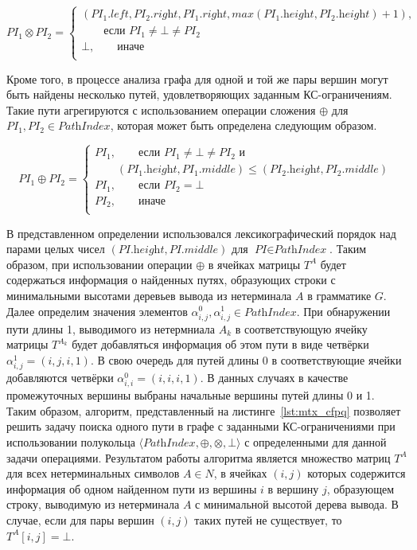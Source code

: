 $$\textit{PI}_1 \otimes \textit{PI}_2 = \begin{cases}
      (\textit{PI}_1.\textit{left}, \textit{PI}_2.\textit{right}, \textit{PI}_1.\textit{right}, max(\textit{PI}_1.\textit{height}, \textit{PI}_2.\textit{height}) + 1),\\
                     \qquad \text{если $\textit{PI}_1\neq \bot \neq \textit{PI}_2$} \\
      \bot, \qquad \text{иначе} \\
    \end{cases}\
$$

Кроме того, в процессе анализа графа для одной и той же пары вершин могут быть найдены несколько путей, удовлетворяющих заданным КС-ограничениям. Такие пути агрегируются с использованием операции сложения $\oplus$ для \mbox{$\textit{PI}_1, \textit{PI}_2 \in \textit{PathIndex}$}, которая может быть определена следующим образом.

$$\textit{PI}_1 \oplus \textit{PI}_2 = \begin{cases}
      \textit{PI}_1, \qquad \text{если $\textit{PI}_1\neq \bot \neq \textit{PI}_2$ и} \\ \qquad (\textit{PI}_1.\textit{height}, \textit{PI}_1.\textit{middle}) \leq (\textit{PI}_2.\textit{height}, \textit{PI}_2.\textit{middle}) \\
      \textit{PI}_1, \qquad \text{если $\textit{PI}_2 = \bot$} \\
      \textit{PI}_2, \qquad \text{иначе} \\
    \end{cases}\
$$

В представленном определении использовался лексикографический порядок над парами целых чисел $(\textit{PI}.\textit{height}, \textit{PI}.\textit{middle})$ для $\textit{PI} \in \textit{PathIndex}$. Таким образом, при использовании операции $\oplus$ в ячейках матрицы $T^A$ будет содержаться информация о найденных путях, образующих строки с минимальными высотами деревьев вывода из нетерминала $A$ в грамматике $G$. Далее определим значения элементов $\alpha^0_{i, j}, \alpha^1_{i, j} \in \textit{PathIndex}$. При обнаружении пути длины 1, выводимого из нетермниала $A_k$ в соответствующую ячейку матрицы $T^{A_k}$ будет добавляться информация об этом пути в виде четвёрки $\alpha^1_{i, j} = (i, j, i, 1)$. В свою очередь для путей длины 0 в соответствующие ячейки добавляются четвёрки $\alpha^0_{i, i} = (i, i, i, 1)$. В данных случаях в качестве промежуточных вершины выбраны начальные вершины путей длины 0 и 1. Таким образом, алгоритм, представленный на листинге~\ref{lst:mtx_cfpq} позволяет решить задачу поиска одного пути в графе с заданными КС-ограничениями при использовании полукольца $\langle \textit{PathIndex}, \oplus, \otimes, \bot \rangle$ с определенными для данной задачи операциями. Результатом работы алгоритма является множество матриц $T^A$ для всех нетерминальных символов $A \in N$, в ячейках $(i, j)$ которых содержится информация об одном найденном пути из вершины $i$ в вершину $j$, образующем строку, выводимую из нетерминала $A$ с минимальной высотой дерева вывода. В случае, если для пары вершин $(i, j)$ таких путей не существует, то $T^A[i, j] = \bot$.

